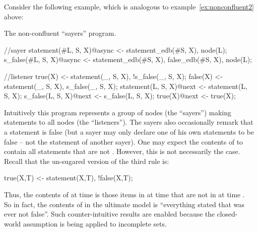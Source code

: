 Consider the following example, which is analogous to example~\ref{ex:nonconfluent2} above:

\begin{example}
\label{ex:sayers}
The non-confluent ``sayers'' program.

\begin{Dedalus}
//sayer
statement(#L, S, X)@async <- statement_edb(#S, X),
                             node(L);
s_false(#L, S, X)@async <- statement_edb(#S, X),
                           false_edb(#S, X),
                           node(L);

//listener
true(X) <- statement(_, S, X), !s_false(_, S, X);
false(X) <- statement(_, S, X), s_false(_, S, X);
statement(L, S, X)@next <- statement(L, S, X);
s_false(L, S, X)@next <- s_false(L, S, X);
true(X)@next <- true(X);
\end{Dedalus}
\end{example}

Intuitively this program represents a group of nodes (the ``sayers'') making statements to all nodes (the ``listeners'').  The sayers also occasionally remark that a statement is false (but a sayer may only declare one of his own statements to be false -- not the statement of another sayer).  One may expect the contents of  to contain all statements that are not .  However, this is not necessarily the case.  Recall that the un-sugared version of the third rule is:

\begin{Dedalus}
true(X,T) <- statement(X,T), !false(X,T);
\end{Dedalus}

Thus, the contents of  at time  is those items in  at time  that are not in  at time .  So in fact, the contents of  in the ultimate model is ``everything stated that was ever not false''.  Such counter-intuitive results are enabled because the closed-world assumption is being applied to incomplete sets.

